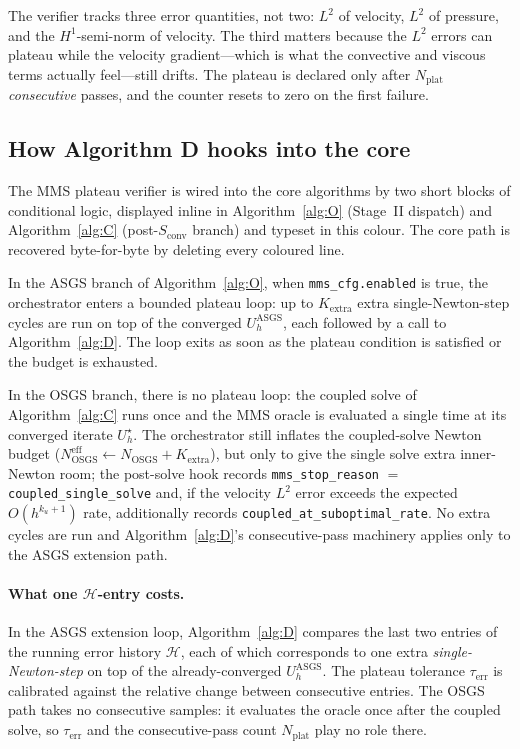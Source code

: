 \documentclass{article}
\newcommand{\code}[1]{\texttt{\small #1}}
\newcommand{\extline}[1]{{\color{extcolor}#1}}
\begin{document}
\extline{The verifier tracks three error quantities, not two: $L^2$
of velocity, $L^2$ of pressure, and the $H^1$-semi-norm of velocity.
The third matters because the $L^2$ errors can plateau while the
velocity gradient---which is what the convective and viscous terms
actually feel---still drifts. The plateau is declared only after
$N_{\mathrm{plat}}$ \emph{consecutive} passes, and the counter resets
to zero on the first failure.}

\subsection{How Algorithm D hooks into the core}
\label{sec:mms-hooks}

\extline{The MMS plateau verifier is wired into the core algorithms by
two short blocks of conditional logic, displayed inline in
Algorithm~\ref{alg:O} (Stage~II dispatch) and Algorithm~\ref{alg:C}
(post-$S_{\mathrm{conv}}$ branch) and typeset in this colour. The
core path is recovered byte-for-byte by deleting every coloured line.}

\extline{In the ASGS branch of Algorithm~\ref{alg:O}, when
\code{mms\_cfg.enabled} is true, the orchestrator enters a bounded
plateau loop: up to $K_{\mathrm{extra}}$ extra single-Newton-step cycles
are run on top of the converged $U_h^{\mathrm{ASGS}}$, each followed
by a call to Algorithm~\ref{alg:D}. The loop exits as soon as the
plateau condition is satisfied or the budget is exhausted.}

\extline{In the OSGS branch, there is no plateau loop: the coupled solve
of Algorithm~\ref{alg:C} runs once and the MMS oracle is evaluated a
single time at its converged iterate $U_h^\star$. The orchestrator still
inflates the coupled-solve Newton budget
($N_{\mathrm{OSGS}}^{\mathrm{eff}} \gets N_{\mathrm{OSGS}} + K_{\mathrm{extra}}$),
but only to give the single solve extra inner-Newton room; the post-solve
hook records \code{mms\_stop\_reason} $=$ \code{coupled\_single\_solve} and,
if the velocity $L^2$ error exceeds the expected $O(h^{k_u+1})$ rate,
additionally records \code{coupled\_at\_suboptimal\_rate}. No extra
cycles are run and Algorithm~\ref{alg:D}'s consecutive-pass machinery
applies only to the ASGS extension path.}

\extline{\paragraph{What one $\mathcal{H}$-entry costs.}
In the ASGS extension loop, Algorithm~\ref{alg:D} compares the last two
entries of the running error history $\mathcal{H}$, each of which
corresponds to one extra \emph{single-Newton-step} on top of the
already-converged $U_h^{\mathrm{ASGS}}$. The plateau tolerance
$\tau_{\mathrm{err}}$ is calibrated against the relative change between
consecutive entries. The OSGS path takes no consecutive samples: it
evaluates the oracle once after the coupled solve, so $\tau_{\mathrm{err}}$
and the consecutive-pass count $N_{\mathrm{plat}}$ play no role there.}
\end{document}
